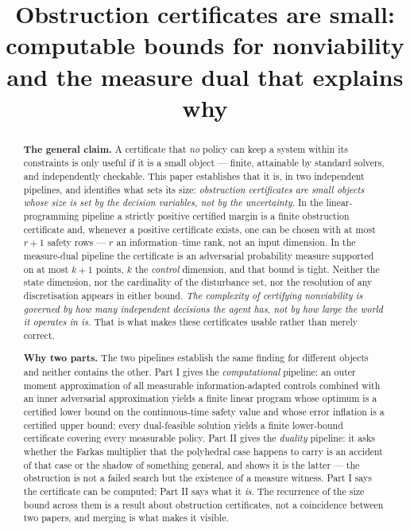 \documentclass[10pt,twocolumn]{article}
\theoremstyle{plain}
\theoremstyle{definition}
\theoremstyle{remark}
\begin{document}
\title{Obstruction certificates are small: computable bounds for nonviability and the measure dual that explains why}
\begin{abstract}
\noindent\textbf{The general claim.} A certificate that \emph{no} policy can keep a system within
its constraints is only useful if it is a small object --- finite, attainable by standard solvers,
and independently checkable. This paper establishes that it is, in two independent pipelines, and
identifies what sets its size: \emph{obstruction certificates are small objects whose size is set
by the decision variables, not by the uncertainty.} In the linear-programming pipeline a strictly
positive certified margin is a finite obstruction certificate and, whenever a positive certificate
exists, one can be chosen with at most $r+1$ safety rows --- $r$ an information--time rank, not an
input dimension. In the measure-dual pipeline the certificate is an adversarial probability measure
supported on at most $k+1$ points, $k$ the \emph{control} dimension, and that bound is tight.
Neither the state dimension, nor the cardinality of the disturbance set, nor the resolution of any
discretisation appears in either bound. \emph{The complexity of certifying nonviability is governed
by how many independent decisions the agent has, not by how large the world it operates in is.}
That is what makes these certificates usable rather than merely correct.

\noindent\textbf{Why two parts.} The two pipelines establish the same finding for different objects
and neither contains the other. Part I gives the \emph{computational} pipeline: an outer moment
approximation of all measurable information-adapted controls combined with an inner adversarial
approximation yields a finite linear program whose optimum is a certified lower bound on the
continuous-time safety value and whose error inflation is a certified upper bound; every
dual-feasible solution yields a finite lower-bound certificate covering every measurable policy.
Part II gives the \emph{duality} pipeline: it asks whether the Farkas multiplier that the
polyhedral case happens to carry is an accident of that case or the shadow of something general,
and shows it is the latter --- the obstruction is not a failed search but the existence of a
measure witness. Part I says the certificate can be computed; Part II says what it \emph{is}. The
recurrence of the size bound across them is a result about obstruction certificates, not a
coincidence between two papers, and merging is what makes it visible.


\end{abstract}
\end{document}

